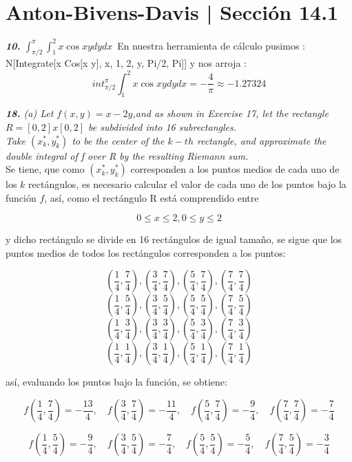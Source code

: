 \documentclass[a4paper,12pt]{article}
\begin{document}
	\section{Anton-Bivens-Davis | Sección 14.1}
	\textit{\textbf{10.} $\int^{\pi}_{\pi / 2}\int^2_1 x \cos xy dy dx$}\
En nuestra herramienta de cálculo pusimos :
N[Integrate[x Cos[x y], {x, 1, 2}, {y, Pi/2, Pi}]] y nos arroja :
\[int^{\pi}_{\pi /2}\int^2_1 x \cos xy dy dx = - \dfrac{4}{\pi} \approx -1.27324\]

	\textit{\textbf{18.} (a) Let $f(x,y) = x - 2y$,and as shown in Exercise 17,
	let the rectangle $ R = [0, 2] x [0, 2]$ be subdivided into 16 subrectangles.\\
	\newline
	Take $(x^{*}_{k}, y^{*}_{k})$ to be the center of the $k-th$ rectangle, and approximate
	the double integral of f over R by the resulting Riemann sum.}\\

	Se tiene, que como $(x^{*}_{k}, y^{*}_{k})$ corresponden a los puntos medios
	de cada uno de los $k$ rectángulos, es necesario calcular el valor de cada
	uno de los puntos bajo la función $f$, así, como el rectángulo R está
	comprendido entre

		$$ 0 \leq x \leq 2, 0 \leq y \leq 2  $$

	y dicho rectángulo se divide en 16 rectángulos de igual tamaño, se sigue que
	los puntos medios de todos los rectángulos corresponden a los puntos:

		$$ (\frac{1}{4}, \frac{7}{4}), (\frac{3}{4}, \frac{7}{4}),
			(\frac{5}{4}, \frac{7}{4}), (\frac{7}{4}, \frac{7}{4}) $$
		$$ (\frac{1}{4}, \frac{5}{4}), (\frac{3}{4}, \frac{5}{4}),
			(\frac{5}{4}, \frac{5}{4}), (\frac{7}{4}, \frac{5}{4}) $$
		$$ (\frac{1}{4}, \frac{3}{4}), (\frac{3}{4}, \frac{3}{4}),
			(\frac{5}{4}, \frac{3}{4}), (\frac{7}{4}, \frac{3}{4}) $$
		$$ (\frac{1}{4}, \frac{1}{4}), (\frac{3}{4}, \frac{1}{4}),
			(\frac{5}{4}, \frac{1}{4}), (\frac{7}{4}, \frac{1}{4}) $$

	así, evaluando los puntos bajo la función, se obtiene:

	$$ f(\frac{1}{4}, \frac{7}{4}) =  - \frac{13}{4}, \quad f(\frac{3}{4}, \frac{7}{4}) =  - \frac{11}{4} , \quad
	   f(\frac{5}{4}, \frac{7}{4}) =  - \frac{9}{4} , \quad f(\frac{7}{4}, \frac{7}{4}) = - \frac{7}{4} $$

	$$ f(\frac{1}{4}, \frac{5}{4}) =  - \frac{9}{4}, \quad f(\frac{3}{4}, \frac{5}{4}) =  - \frac{7}{4} , \quad
	   f(\frac{5}{4}, \frac{5}{4}) =  - \frac{5}{4} , \quad f(\frac{7}{4}, \frac{5}{4}) = - \frac{3}{4} $$
\end{document}
